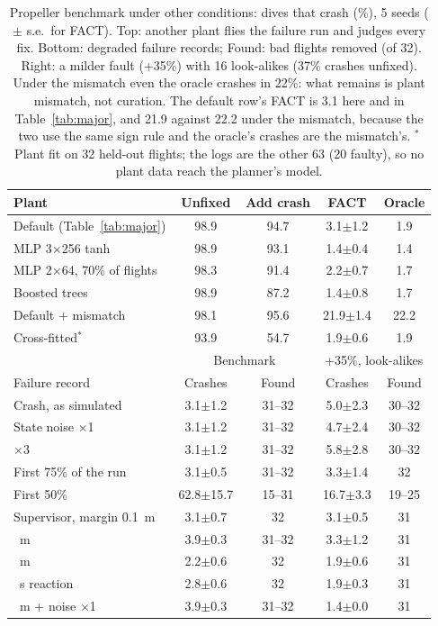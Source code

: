 \documentclass[preprint,12pt]{elsarticle}
\newcommand{\method}{FACT}
\begin{document}
\begin{table}[t]
\caption{Propeller benchmark under other conditions: dives that crash (\%), 5 seeds ($\pm$ s.e.\ for \method{}). Top: another plant flies the failure run and judges every fix. Bottom: degraded failure records; Found: bad flights removed (of 32). Right: a milder fault (+35\%) with 16 look-alikes (37\% crashes unfixed). Under the mismatch even the oracle crashes in 22\%: what remains is plant mismatch, not curation. The default row's \method{} is 3.1 here and in Table~\ref{tab:major}, and 21.9 against 22.2 under the mismatch, because the two use the same sign rule and the oracle's crashes are the mismatch's. $^\ast$Plant fit on 32 held-out flights; the logs are the other 63 (20 faulty), so no plant data reach the planner's model.}
\label{tab:plants}
\centering\footnotesize
\setlength{\tabcolsep}{4pt}
\begin{tabular}{@{}lcccc@{}}
\toprule
Plant & Unfixed & Add crash & \method{} & Oracle \\
\midrule
Default (Table~\ref{tab:major}) & 98.9 & 94.7 & 3.1$\pm$1.2 & 1.9 \\
MLP 3$\times$256 tanh & 98.9 & 93.1 & 1.4$\pm$0.4 & 1.4 \\
MLP 2$\times$64, 70\% of flights & 98.3 & 91.4 & 2.2$\pm$0.7 & 1.7 \\
Boosted trees & 98.9 & 87.2 & 1.4$\pm$0.8 & 1.7 \\
Default + mismatch & 98.1 & 95.6 & 21.9$\pm$1.4 & 22.2 \\
Cross-fitted$^\ast$ & 93.9 & 54.7 & 1.9$\pm$0.6 & 1.9 \\
\midrule
 & \multicolumn{2}{c}{Benchmark} & \multicolumn{2}{c}{+35\%, look-alikes} \\
Failure record & Crashes & Found & Crashes & Found \\
\midrule
Crash, as simulated & 3.1$\pm$1.2 & 31--32 & 5.0$\pm$2.3 & 30--32 \\
State noise $\times$1 & 3.1$\pm$1.2 & 31--32 & 4.7$\pm$2.4 & 30--32 \\
\quad $\times$3 & 3.1$\pm$1.2 & 31--32 & 5.8$\pm$2.8 & 30--32 \\
First 75\% of the run & 3.1$\pm$0.5 & 31--32 & 3.3$\pm$1.4 & 32 \\
First 50\% & 62.8$\pm$15.7 & 15--31 & 16.7$\pm$3.3 & 19--25 \\
Supervisor, margin 0.1~m & 3.1$\pm$0.7 & 32 & 3.1$\pm$0.5 & 31 \\
\quad 0.5~m & 3.9$\pm$0.3 & 31--32 & 3.3$\pm$1.2 & 31 \\
\quad 1.0~m & 2.2$\pm$0.6 & 32 & 1.9$\pm$0.6 & 31 \\
\quad 0.3~s reaction & 2.8$\pm$0.6 & 32 & 1.9$\pm$0.3 & 31 \\
\quad 0.5~m + noise $\times$1 & 3.9$\pm$0.3 & 31--32 & 1.4$\pm$0.0 & 31 \\
\bottomrule
\end{tabular}
\end{table}
\end{document}
